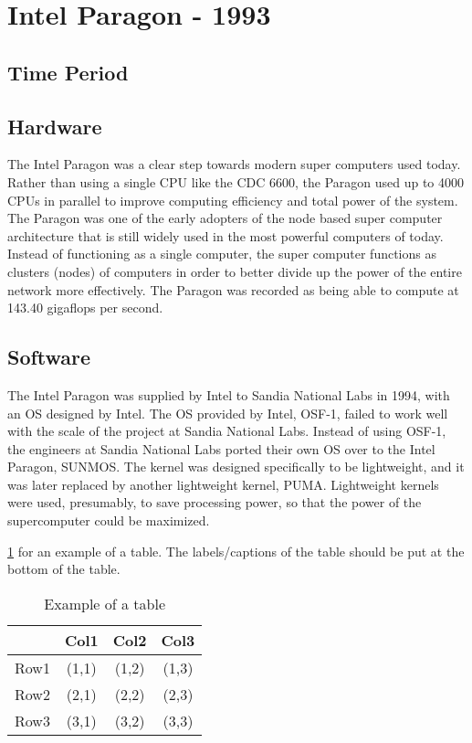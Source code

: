 \documentclass[letterpaper, 10 pt, conference]{IEEEconf}
\begin{document}
\section{Intel Paragon - 1993}
\subsection{Time Period}
\subsection{Hardware}
The Intel Paragon was a clear step towards modern super computers used today. Rather than using a single CPU like the CDC 6600, the Paragon used up to 4000 CPUs in parallel to improve computing efficiency and total power of the system. The Paragon was one of the early adopters of the node based super computer architecture that is still widely used in the most powerful computers of today. Instead of functioning as a single computer, the super computer functions as clusters (nodes) of computers in order to better divide up the power of the entire network more effectively. The Paragon was recorded as being able to compute at 143.40 gigaflops per second. 
\subsection{Software}
The Intel Paragon was supplied by Intel to Sandia National Labs in
1994, with an OS designed by Intel. The OS provided by Intel,
OSF-1, failed to work well with the scale of the project at Sandia
National Labs. Instead of using OSF-1, the engineers at Sandia
National Labs ported their own OS over to the Intel Paragon,
SUNMOS. The kernel was designed specifically to be lightweight,
and it was later replaced by another lightweight kernel, PUMA.
Lightweight kernels were used, presumably, to save processing
power, so that the power of the supercomputer could be maximized.


\ref{tbl:example} for an example of a table.
The labels/captions of the table should be put at the bottom
of the table.


\begin{table}[h!]
\begin{center}
\begin{tabular}{||c | c | c | c||} 
\hline
  & Col1 & Col2 & Col3 \\ [0.5ex]
\hline\hline
Row1 & (1,1) & (1,2) & (1,3) \\ 
\hline
Row2 & (2,1) & (2,2) & (2,3) \\
\hline
Row3 & (3,1) & (3,2) & (3,3) \\
\hline
\end{tabular}
\caption{Example of a table}
\label{tbl:example}
\end{center}
\end{table}
\end{document}
